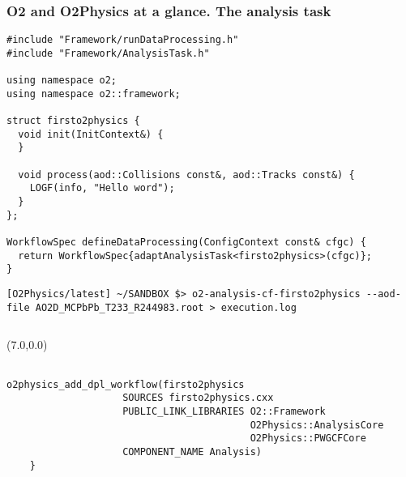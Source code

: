 \documentclass[14pt,aspectratio=169,t]{beamer}
\begin{document}
\begin{frame}[fragile]
  \frametitle{O2 and O2Physics at a glance. The analysis task}
  \vspace{-0.1in}
  {\tiny \color{blue}
  \begin{verbatim}
#include "Framework/runDataProcessing.h"
#include "Framework/AnalysisTask.h"

using namespace o2;
using namespace o2::framework;

struct firsto2physics {
  void init(InitContext&) {
  }

  void process(aod::Collisions const&, aod::Tracks const&) {
    LOGF(info, "Hello word");
  }
};

WorkflowSpec defineDataProcessing(ConfigContext const& cfgc) {
  return WorkflowSpec{adaptAnalysisTask<firsto2physics>(cfgc)};
}
  \end{verbatim}
  }
  \vspace{-0.25in}
  {\tiny \color{black}
  \begin{verbatim}
[O2Physics/latest] ~/SANDBOX $> o2-analysis-cf-firsto2physics --aod-file AO2D_MCPbPb_T233_R244983.root > execution.log    
  \end{verbatim}}
  \vspace{-0.25in}
  {\tiny \color{red}
  \begin{verbatim}
  \end{verbatim}}
  
  \begin{textblock}{6}(7.0,0.0)
    {\tiny\color{blue}
    \begin{verbatim}

o2physics_add_dpl_workflow(firsto2physics
                    SOURCES firsto2physics.cxx
                    PUBLIC_LINK_LIBRARIES O2::Framework 
                                          O2Physics::AnalysisCore
                                          O2Physics::PWGCFCore
                    COMPONENT_NAME Analysis)
    }
    \end{verbatim}}
  \end{textblock}

\end{frame}
\end{document}

